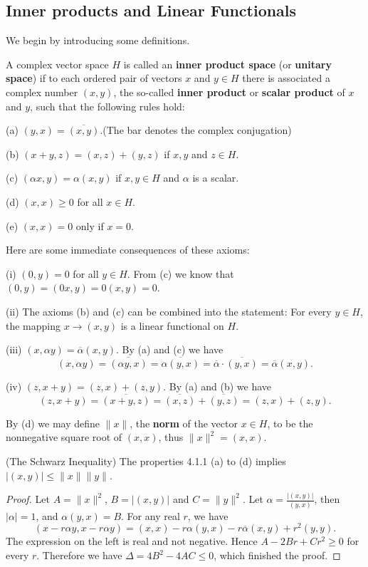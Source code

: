 \subsection{Inner products and Linear Functionals}
We begin by introducing some definitions.
\begin{definition}
A complex vector space $H$ is called an \textbf{inner product space} (or \textbf{unitary space}) if to each ordered pair of vectors $x$ and $y\in H$ there is associated a complex number $(x,y)$, the so-called \textbf{inner product} or \textbf{scalar product} of $x$ and $y$, such that the following rules hold:\par
(a) $(y,x)=\overline{(x,y)}$.(The bar denotes the complex conjugation)\par
(b) $(x+y,z)=(x,z)+(y,z)$ if $x,y$ and $z\in H$.\par
(c) $(\alpha x,y)=\alpha(x,y)$ if $x,y\in H$ and $\alpha$ is a scalar.\par
(d) $(x,x)\ge 0$ for all $x\in H$.\par
(e) $(x,x)=0$ only if $x=0$.
\end{definition}
Here are some immediate consequences of these axioms:\par
(i) $(0,y)=0$ for all $y\in H$. From (c) we know that $(0,y)=(0x,y)=0(x,y)=0$.\par
(ii) The axioms (b) and (c) can be combined into the statement: For every $y\in H$, the mapping $x\to(x,y)$ is a linear functional on $H$.\par
(iii) $(x,\alpha y)=\overline{\alpha}(x,y)$. By (a) and (c) we have 
$$
\left( x,\alpha y \right) =\overline{\left( \alpha y,x \right) }=\overline{\alpha \left( y,x \right) }=\overline{\alpha }\cdot \overline{\left( y,x \right) }=\overline{\alpha }\left( x,y \right) .
$$\par
(iv) $(z,x+y)=(z,x)+(z,y)$. By (a) and (b) we have 
$$
\left( z,x+y \right) =\overline{\left( x+y,z \right) }=\overline{\left( x,z \right) }+\overline{\left( y,z \right) }=\left( z,x \right) +\left( z,y \right) .
$$\par
By (d) we may define $\|x\|$, the \textbf{norm} of the vector $x\in H$, to be the nonnegative square root of $(x,x)$, thus $\|x\|^2=(x,x)$.
\begin{theorem}(The Schwarz Inequality)
The properties 4.1.1 (a) to (d) implies $|(x,y)|\le\|x\|\|y\|$.
\end{theorem}
\begin{proof}
Let $A=\|x\|^2$, $B=|(x,y)|$ and $C=\|y\|^2$. Let $\alpha=\frac{|(x,y)|}{(y,x)}$, then $|\alpha|=1$, and $\alpha(y,x)=B$. For any real $r$, we have 
$$
\left( x-r\alpha y,x-r\alpha y \right) =\left( x,x \right) -r\alpha \left( y,x \right) -r\overline{\alpha }\left( x,y \right) +r^2\left( y,y \right) .
$$
The expression on the left is real and not negative. Hence $A-2Br+Cr^2\ge 0$ for every $r$. Therefore we have $\Delta=4B^2-4AC\le 0$, which finished the proof.
\end{proof}
